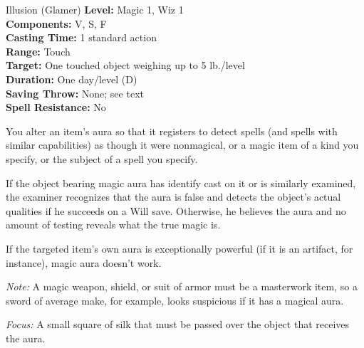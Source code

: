 {Illusion (Glamer)}
{
	\textbf{Level:}
	Magic 1, Wiz 1\\
	\textbf{Components:}
	V, S, F\\
	\textbf{Casting Time:}
	1 standard action\\
	\textbf{Range:}
	Touch\\
	\textbf{Target:}
	One touched object weighing up to 5 lb./level\\
	\textbf{Duration:}
	One day/level (D)\\
	\textbf{Saving Throw:}
	None; see text\\
	\textbf{Spell Resistance:}
	No\\
}
{
	You alter an item's aura so that it registers to detect spells (and spells with similar capabilities) as though it were nonmagical, or a magic item of a kind you specify, or the subject of a spell you specify.

	If the object bearing magic aura has identify cast on it or is similarly examined, the examiner recognizes that the aura is false and detects the object's actual qualities if he succeeds on a Will save. Otherwise, he believes the aura and no amount of testing reveals what the true magic is.

	If the targeted item's own aura is exceptionally powerful (if it is an artifact, for instance), magic aura doesn't work.

	\textit{Note:} A magic weapon, shield, or suit of armor must be a masterwork item, so a sword of average make, for example, looks suspicious if it has a magical aura.

	\textit{Focus:}
	A small square of silk that must be passed over the object that receives the aura.

}
